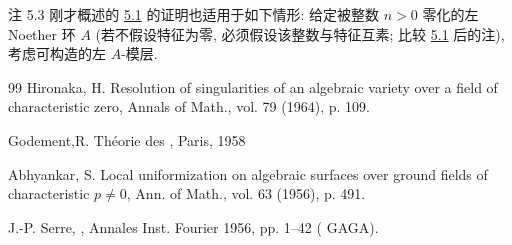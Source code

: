 \begin{enonce*}[remark]{注 5.3}
刚才概述的 \hyperref[XVI.thm5.1]{5.1} 的证明也适用于如下情形: 给定被整数 $n>0$ 零化的左 Noether 环 $A$ (若不假设特征为零, 必须假设该整数与特征互素; 比较 \hyperref[XVI.thm5.1]{5.1} 后的注), 考虑可构造的左 $A$-模层.
\end{enonce*}

\begin{thebibliography}{99}
 Hironaka, H. Resolution of singularities of an
algebraic variety over a field of characteristic zero, Annals of
Math., vol. 79 (1964), p. 109.

 Godement,\pageoriginale R. Théorie des
, Paris, 1958

 Abhyankar, S. Local uniformization on algebraic
surfaces over ground fields of characteristic $p\neq0$, Ann. of
Math., vol. 63 (1956), p. 491.

 J.-P. Serre, ,
Annales Inst. Fourier 1956, pp. 1--42 ( GAGA).
\end{thebibliography}

